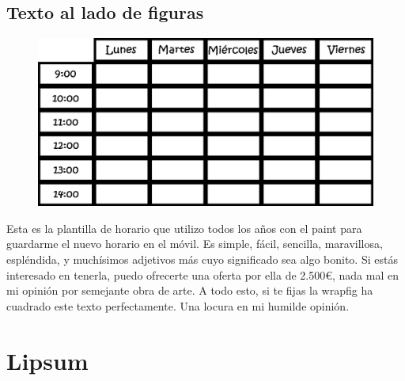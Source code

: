 \documentclass{article}
\begin{document}
    \subsection{Texto al lado de figuras}
        \begin{figure}
            \vspace{-13pt}
            \includegraphics[scale=0.1]{PlantillaHorario.png}
        \end{figure}
        Esta es la plantilla de horario que utilizo todos los años con el paint
        para guardarme el nuevo horario en el móvil. Es simple, fácil, sencilla,
        maravillosa, espléndida, y muchísimos adjetivos más cuyo significado sea 
        algo bonito. Si estás interesado en tenerla, puedo ofrecerte una oferta
        por ella de 2.500€, nada mal en mi opinión por semejante obra de arte. A 
        todo esto, si te fijas la wrapfig ha cuadrado este texto perfectamente. 
        Una locura en mi humilde opinión.
    \newpage

\section{Lipsum}
\lipsum[1-10]
\end{document}
